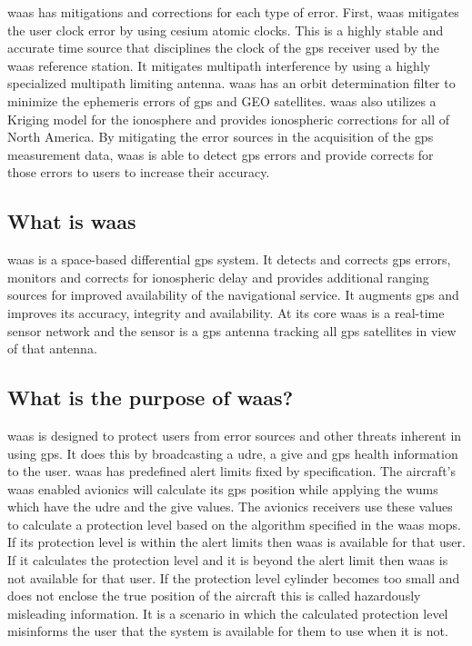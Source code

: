 \ac{waas} has mitigations and corrections for each type of error. First, \ac{waas}
mitigates the user clock error by using cesium atomic clocks. This is a
highly stable and accurate time source that disciplines the clock of the
\ac{gps} receiver used by the \ac{waas} reference station. It mitigates multipath
interference by using a highly specialized multipath limiting antenna.
\ac{waas} has an orbit determination filter to minimize the ephemeris errors
of \ac{gps} and GEO satellites. \ac{waas} also utilizes a Kriging model for the
ionosphere and provides ionospheric corrections for all of North
America. By mitigating the error sources in the acquisition of the \ac{gps}
measurement data, \ac{waas} is able to detect \ac{gps} errors and provide corrects
for those errors to users to increase their accuracy.

\subsection{What is \ac{waas}}\label{what-is-the-wide-area-augmentation-system-waas}

\ac{waas} is a space-based differential
\ac{gps} system. It detects and corrects \ac{gps} errors, monitors and corrects
for ionospheric delay and provides additional ranging sources for
improved availability of the navigational service. It augments \ac{gps} and
improves its accuracy, integrity and availability. At its core \ac{waas} is a real-time sensor network and the
sensor is a \ac{gps} antenna tracking all \ac{gps} satellites in view of that
antenna.

\subsection{What is the purpose of
\ac{waas}?}\label{what-is-the-purpose-of-waas}

\ac{waas} is designed to protect users from error sources and other threats
inherent in using \ac{gps}. It does this by broadcasting a \ac{udre}, a \ac{give} and \ac{gps}
health information to the user. \ac{waas} has predefined alert limits fixed
by specification. The aircraft's \ac{waas} enabled avionics will calculate
its \ac{gps} position while applying the \acp{wum} which have the
\ac{udre} and the \ac{give} values. The avionics receivers use these values to
calculate a protection level based on the algorithm specified in the
\ac{waas} \ac{mops}. If its protection level is within the alert limits then \ac{waas}
is available for that user. If it calculates the protection level and it
is beyond the alert limit then \ac{waas} is not available for that user. If
the protection level cylinder becomes too small and does not enclose the
true position of the aircraft this is called hazardously misleading
information. It is a scenario in which the calculated protection level
misinforms the user that the system is available for them to use when it
is not.

